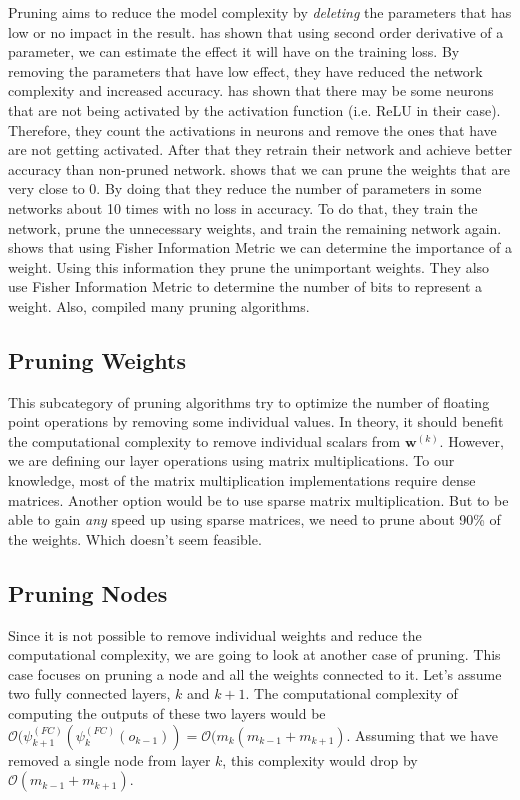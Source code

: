 Pruning aims to reduce the model complexity by \textit{deleting} the parameters that has low or no impact in the result. \cite{lecun1989optimal} has shown that using second order derivative of a parameter, we can estimate the effect it will have on the training loss. By removing the parameters that have low effect, they have reduced the network complexity and increased accuracy. \cite{Hu:2016aa} has shown that there may be some neurons that are not being activated by the activation function (i.e. ReLU in their case). Therefore, they count the activations in neurons and remove the ones that have are not getting activated. After that they retrain their network and achieve better accuracy than non-pruned network. \cite{han2015learning} shows that we can prune the weights that are very close to 0. By doing that they reduce the number of parameters in some networks about 10 times with no loss in accuracy. To do that, they train the network, prune the unnecessary weights, and train the remaining network again.  \cite{tu2016reducing} shows that using Fisher Information Metric we can determine the importance of a weight. Using this information they prune the unimportant weights. They also use Fisher Information Metric to determine the number of bits to represent a weight. Also, \cite{reed1993pruning} compiled many pruning algorithms.

\subsection{Pruning Weights}
This subcategory of pruning algorithms try to optimize the number of floating point operations by removing some individual values. In theory, it should benefit the computational complexity to remove individual scalars from $\mathbf{w}^{(k)}$. However, we are defining our layer operations using matrix multiplications. To our knowledge, most of the matrix multiplication implementations require dense matrices. Another option would be to use sparse matrix multiplication. But to be able to gain \textit{any} speed up using sparse matrices, we need to prune about 90\% of the weights. Which doesn't seem feasible. 

\subsection{Pruning Nodes}
Since it is not possible to remove individual weights and reduce the computational complexity, we are going to look at another case of pruning. This case focuses on pruning a node and all the weights connected to it. Let's assume two fully connected layers, $k$ and $k+1$. The computational complexity of computing the outputs of these two layers would be $\mathcal{O}(\psi^{(FC)}_{k+1}(\psi^{(FC)}_{k}(o_{k-1})) = \mathcal{O}(m_k(m_{k-1} + m_{k+1})$. Assuming that we have removed a single node from layer $k$, this complexity would drop by $\mathcal{O}(m_{k-1} + m_{k+1})$. 

